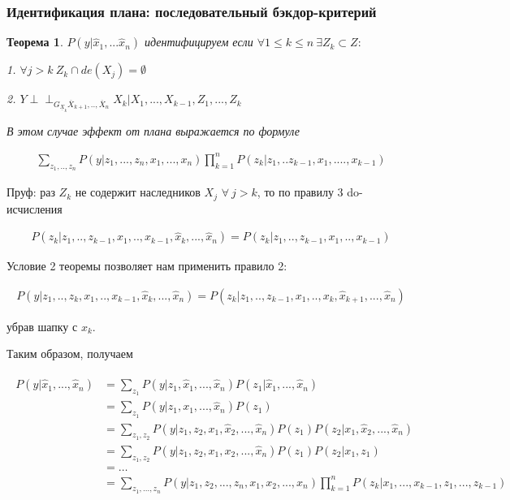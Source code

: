 \documentclass[fleqn]{article}
\newcommand{\independent}{\perp \!\!\! \perp}
\newtheorem{theorem}{Теорема}
\numberwithin{equation}{section}
\numberwithin{theorem}{section}
\numberwithin{figure}{section}
\numberwithin{lemma}{section}
\numberwithin{corollary}{section}
\begin{document}
\subsubsection*{Идентификация плана: последовательный бэкдор-критерий}

\begin{theorem}
	$P(y|\hat x_1, ...\hat x_n)$ идентифицируем если $\forall 1 \le k \le n \ \exists Z_k \subset Z:$ 
	
	1. $ \forall j > k \ Z_k \cap de(X_j) = \emptyset$
	
	2. $Y \independent_{G_{\underline{X}_k}\overline{X}_{k+1},..,\overline{X}_n} X_k | X_1, ..., X_{k-1}, Z_1, ..., Z_k$
	
	В этом случае эффект от плана выражается по формуле 
	
	\begin{align}
		\sum\limits_{z_1,..,z_n}P(y|z_1,...,z_n,x_1,...,x_n)\prod\limits_{k=1}^nP(z_k|z_1,..z_{k-1}, x_1,....,x_{k-1})
	\end{align}
\end{theorem}

Пруф: раз $Z_k$ не содержит наследников $X_j$ $\forall \ j > k$, то по правилу 3 do-исчисления

\begin{align}
	P(z_k|z_1,..,z_{k-1},x_1,..,x_{k-1}, \hat x_k, ...,\hat x_n) = P(z_k|z_1,..,z_{k-1},x_1,..,x_{k-1}) 
\end{align}

Условие 2 теоремы позволяет нам применить правило 2:

\begin{align}
	P(y|z_1,..,z_{k},x_1,..,x_{k-1}, \hat x_k, ...,\hat x_n) = P(z_k|z_1,..,z_{k-1},x_1,..,x_k,\hat x_{k+1},...,\hat x_n) 
\end{align}

убрав шапку с $x_k$.

Таким образом, получаем 

\begin{align}
	\begin{split}
	P(y|\hat x_1,...,\hat x_n) &= \sum\limits_{z_1}P(y|z_1,\hat x_1,...,\hat x_n)P(z_1|\hat x_1,...,\hat x_n) \\
	&=  \sum\limits_{z_1}P(y|z_1, x_1,...,\hat x_n)P(z_1) \\
	&= \sum\limits_{z_1,z_2}P(y|z_1, z_2, x_1, \hat x_2,...,\hat x_n)P(z_1)P(z_2|x_1,\hat x_2,...,\hat x_n) \\
	&=\sum\limits_{z_1,z_2}P(y|z_1, z_2, x_1, x_2,...,\hat x_n)P(z_1)P(z_2|x_1,z_1)\\
	&= \ldots \\
	&= \sum\limits_{z_1,...,z_n}P(y|z_1, z_2, ..., z_n, x_1, x_2,...,x_n)\prod\limits_{k=1}^nP(z_k|x_1,...,x_{k-1},z_1,...,z_{k-1})
	\end{split}
\end{align}
\end{document}

